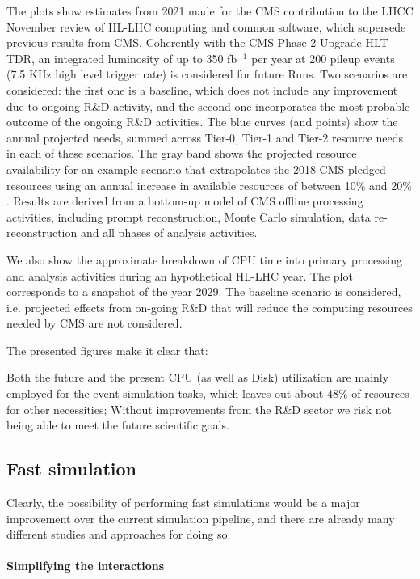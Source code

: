 The plots show estimates from 2021 made for the CMS contribution to the LHCC November review of HL-LHC computing and common software, which supersede previous results from CMS. Coherently with the CMS Phase-2 Upgrade HLT TDR, an integrated luminosity of up to 350 fb$^{-1}$ per year at 200 pileup events (7.5 KHz high level trigger rate) is considered for future Runs. Two scenarios are considered: the first one is a baseline, which does not include any improvement due to ongoing R\&D activity, and the second one incorporates the most probable outcome of the ongoing R\&D activities. The blue curves (and points) show the annual projected needs, summed across Tier-0, Tier-1 and Tier-2 resource needs in each of these scenarios. The gray band shows the projected resource availability for an example scenario that extrapolates the 2018 CMS pledged resources using an annual increase in available resources of between 10$\%$ and 20$\%$. Results are derived from a bottom-up model of CMS offline processing activities, including prompt reconstruction, Monte Carlo simulation, data re-reconstruction and all phases of analysis activities. 

We also show the approximate breakdown of CPU time into primary processing and analysis activities during an hypothetical HL-LHC year. The plot corresponds to a snapshot of the year 2029. The baseline scenario is considered, i.e. projected effects from on-going R\&D that will reduce the computing resources needed by CMS are not considered.

The presented figures make it clear that:

\begin{outline}
    \1 Both the future and the present CPU (as well as Disk) utilization are mainly employed for the event simulation tasks, which leaves out about 48$\%$ of resources for other necessities;
    \1 Without improvements from the R\&D sector we risk not being able to meet the future scientific goals.
\end{outline}


\subsection{Fast simulation}\label{sec:fastsim}

Clearly, the possibility of performing fast simulations would be a major improvement over the current simulation pipeline, and there are already many different studies and approaches for doing so.

\paragraph{Simplifying the interactions}

